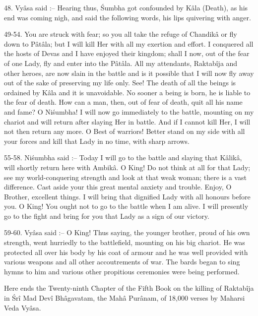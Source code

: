48. Vy\^asa said :-- Hearing thus, \'Sumbha got confounded by K\^ala (Death), as his end was coming nigh, and said the following words, his lips quivering with anger.

49-54. You are struck with fear; so you all take the refuge of Chandik\^a or fly down to P\^at\^ala; but I will kill Her with all my exertion and effort. I conquered all the hosts of Devas and I have enjoyed their kingdom; shall I now, out of the fear of one Lady, fly and enter into the P\^at\^ala. All my attendants, Raktab\^ija and other heroes, are now slain in the battle and is it possible that I will now fly away out of the sake of preserving my life only. See! The death of all the beings is ordained by K\^ala and it is unavoidable. No sooner a being is born, he is liable to the fear of death. How can a man, then, out of fear of death, quit all his name and fame? O Ni\'sumbha! I will now go immediately to the battle, mounting on my chariot and will return after slaying Her in battle. And if I cannot kill Her, I will not then return any more. O Best of warriors! Better stand on my side with all your forces and kill that Lady in no time, with sharp arrows.

55-58. Ni\'sumbha said :-- Today I will go to the battle and slaying that K\^alik\^a, will shortly return here with Ambik\^a. O King! Do not think at all for that Lady; see my world-conquering strength and look at that weak woman; there is a vast difference. Cast aside your this great mental anxiety and trouble. Enjoy, O Brother, excellent things. I will bring that dignified Lady with all honours before you. O King! You ought not to go to the battle when I am alive. I will presently go to the fight and bring for you that Lady as a sign of our victory.

59-60. Vy\^asa said :-- O King! Thus saying, the younger brother, proud of his own strength, went hurriedly to the battlefield, mounting on his big chariot. He was protected all over his body by his coat of armour and he was well provided with various weapons and all other accoutrements of war. The bards began to sing hymns to him and various other propitious ceremonies were being performed.

Here ends the Twenty-ninth Chapter of the Fifth Book on the killing of Raktab\^ija in \'Sr\^i Mad Dev\^i Bh\^agavatam, the Mah\^a Pur\^anam, of 18,000 verses by Maharsi Veda Vy\^asa.

